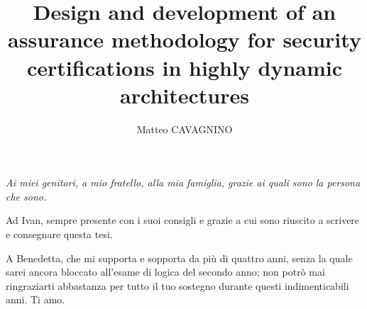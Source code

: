 \documentclass[hidelinks, a4paper, 12pt]{report}
\theoremstyle{definition}
\begin{document}
\title{Design and development of an assurance methodology for security certifications in highly dynamic architectures}
\author{Matteo CAVAGNINO}
%
% 
\beforepreface %
%
\prefacesection{}
     {\hfill \Large {\sl Ai miei genitori, a mio fratello, alla mia famiglia, grazie ai quali sono la persona che sono.
     
     \vspace{1em}\noindent Ad Ivan, sempre presente con i suoi consigli e grazie a cui sono riuscito a scrivere e consegnare questa tesi.
     
     \vspace{1em}\noindent A Benedetta, che mi supporta e sopporta da più di quattro anni, senza la quale sarei ancora bloccato all'esame di logica del secondo anno; non potrò mai ringraziarti abbastanza per tutto il tuo sostegno durante questi indimenticabili anni. Ti amo.
     
     }}
% 
%

%
%
\end{document}
